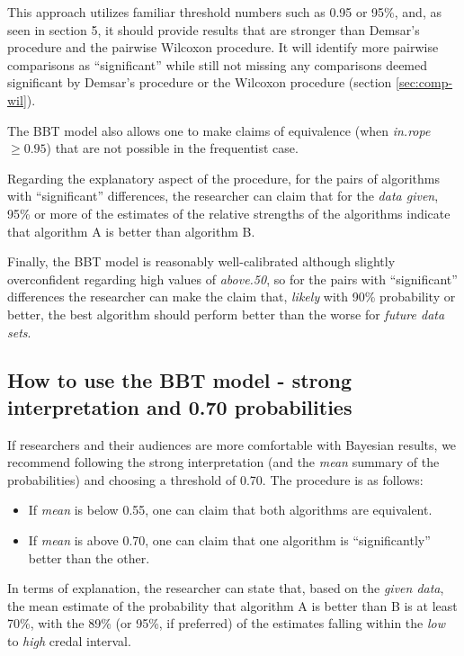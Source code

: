 \documentclass[twoside,11pt,preprint]{article}
\begin{document}
This approach utilizes familiar threshold numbers such as 0.95 or 95\%, and, as seen in section 5, it should provide results that are stronger than Demsar's procedure and the pairwise Wilcoxon procedure. It will identify more pairwise comparisons as ``significant'' while still not missing any comparisons deemed significant by Demsar's procedure or the Wilcoxon procedure (section \ref{sec:comp-wil}).

The BBT model also allows one to make claims of equivalence (when
{\em in.rope} \(\ge 0.95\)) that are not possible in the frequentist
case.

Regarding the explanatory aspect of the procedure, for the pairs of
algorithms with ``significant'' differences, the researcher can claim
that for the \emph{data given}, 95\% or more of the estimates of the
relative strengths of the algorithms indicate that algorithm A is
better than algorithm B.

Finally, the BBT model is reasonably well-calibrated although slightly
overconfident regarding high values of {\em above.50}, so for the
pairs with ``significant'' differences the researcher can make the claim
that, \emph{likely} with 90\% probability or better, the best algorithm
should perform better than the worse for \emph{future data sets}.

\hypertarget{how-to-use-the-bbt-model---strong-interpretation-and-0.70-probabilities}{%
\subsection{How to use the BBT model - strong interpretation and 0.70 probabilities}\label{how-to-use-the-bbt-model---strong-interpretation-and-0.70-probabilities}}

If researchers and their audiences are more comfortable with Bayesian results, we recommend following the strong interpretation (and the {\em mean} summary of the probabilities) and choosing a threshold of 0.70. The procedure is as follows:

\begin{itemize}
\item
  If {\em mean} is below 0.55, one can claim that both algorithms are equivalent.
\item
  If {\em mean} is above 0.70, one can claim that one algorithm is ``significantly'' better than the other.
\end{itemize}

In terms of explanation, the researcher can state that, based on the \emph{given data}, the mean estimate of the probability that algorithm A is better than B is at least 70\%, with the 89\% (or 95\%, if preferred) of the estimates falling within the {\em low} to {\em high} credal interval.
\end{document}
